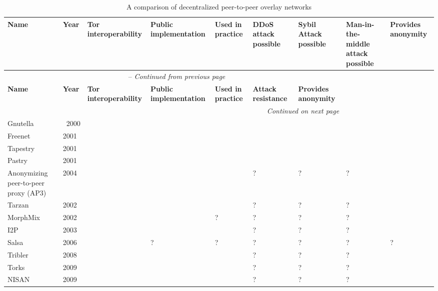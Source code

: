 \begin{landscape}

\begin{center}
    \begin{longtable}{ | p{1.9cm} | p{0.8cm} | p{1.6cm} | p{2.2cm} | p{2.2cm} | p{2.2cm} | p{2.0cm} | p{2cm} | p{2cm} | }
  		\caption{A comparison of decentralized peer-to-peer overlay networks} \\ \hline
	    \textbf{Name} & \textbf{Year} & \textbf{Tor interoperability} & \textbf{Public implementation} & \textbf{Used in practice} & \textbf{DDoS attack possible} & \textbf{Sybil Attack possible} & \textbf{Man-in-the-middle attack possible} & \textbf{Provides anonymity} \\ \hline
		\endfirsthead
		\multicolumn{7}{c}{\tablename\ \thetable\ -- \textit{Continued from previous page}} \\ \hline
	    \textbf{Name} & \textbf{Year} & \textbf{Tor interoperability} & \textbf{Public implementation} & \textbf{Used in practice} & \textbf{Attack resistance} & \textbf{Provides anonymity} \\ \hline
		\endhead
		\hline \multicolumn{7}{r}{\textit{Continued on next page}} \\
		\endfoot
		\hline
		\endlastfoot
	    
		Gnutella & ~2000 & & \checkmark & \checkmark & \checkmark & \checkmark & \checkmark & \\ \hline
		Freenet & 2001 & & \checkmark & \checkmark & & \checkmark & \checkmark & \checkmark\\ \hline
		Tapestry & 2001 & & \checkmark & \checkmark & & \checkmark & \checkmark & \\ \hline
		Pastry & 2001 & & \checkmark & \checkmark & & \checkmark & \checkmark & \\ \hline
		Anonymizing peer-to-peer proxy (AP3) & 2004 & & & & ? & ? & ? & \checkmark\\ \hline
		Tarzan & 2002 & & & & ? & ? & ? & \checkmark\\ \hline
		MorphMix & 2002 & & \checkmark & ? & ? & ? & ? & \checkmark \\ \hline
		I2P & 2003 & & \checkmark & \checkmark & ? & ? & ? & \checkmark\\ \hline
		Salsa & 2006 & & ? & ? & ? & ? & ? & ?\\ \hline
		Tribler & 2008 & & \checkmark & \checkmark & ? & ? & ? &\\ \hline
		Torks & 2009 & \checkmark & & & ? & ? & ? & \checkmark\\ \hline
		NISAN & 2009 & & & & ? & ? & ? & \checkmark\\ \hline
    \end{longtable}
\end{center}

\end{landscape}